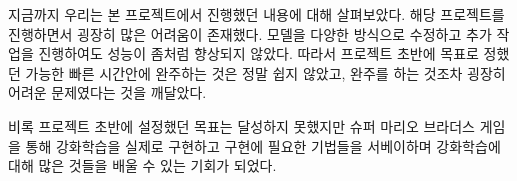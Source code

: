 지금까지 우리는 본 프로젝트에서 진행했던 내용에 대해 살펴보았다.
해당 프로젝트를 진행하면서 굉장히 많은 어려움이 존재했다. 
모델을 다양한 방식으로 수정하고 추가 작업을 진행하여도 성능이 좀처럼 향상되지 않았다.
따라서 프로젝트 초반에 목표로 정했던 가능한 빠른 시간안에 완주하는 것은 정말 쉽지 않았고, 완주를 하는 것조차 굉장히 어려운 문제였다는 것을 깨달았다.

비록 프로젝트 초반에 설정했던 목표는 달성하지 못했지만 슈퍼 마리오 브라더스 게임을 통해 강화학습을 실제로 구현하고 구현에 필요한 기법들을 서베이하며 강화학습에 대해 많은 것들을 배울 수 있는 기회가 되었다.

